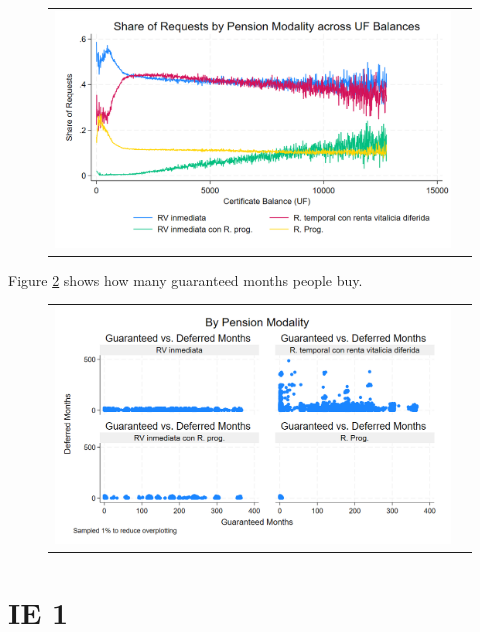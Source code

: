 \documentclass[12pt]{article}
\begin{document}
\begin{figure}[H] 
\caption{}
\label{fig:ie0_4}
\centering{}%
\begin{tabular}{cc}
\includegraphics[scale=0.27]{../figures/IE0_plot4.png}
\end{tabular}
\end{figure}

Figure \ref{fig:ie0_5} shows how many guaranteed months people buy. 
\begin{figure}[H] 
\caption{}
\label{fig:ie0_5}
\centering{}%
\begin{tabular}{cc}
\includegraphics[scale=0.27]{../figures/IE0_plot5.png}
\end{tabular}
\end{figure}

\section{IE 1}
\end{document}
